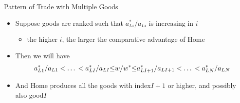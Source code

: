 \documentclass[10pt,hyperref={CJKbookmarks=true},xcolor=dvipsnames,aspectratio=169]{beamer}
\begin{document}
\begin{frame}{Pattern of Trade with Multiple Goods}

\begin{itemize}
\item Suppose goods are ranked such that $a_{Li}^{*}/a_{Li}$ is increasing
in $i$ 

\begin{itemize}
\item the higher $i$, the larger the comparative advantage of Home 
\end{itemize}
\item Then we will have 
\[
a_{L1}^{*}/a_{L1}<\text{…}<a_{LI}^{*}/a_{LI}\text{\ensuremath{\le}}w/w^{*}\text{\ensuremath{\le}}a_{LI+1}^{*}/a_{LI+1}<\text{…}<a_{LN}^{*}/a_{LN}
\]

\item And Home produces all the goods with index$I+1$ or higher, and possibly
also good$I$
\end{itemize}
\end{frame}
\end{document}
